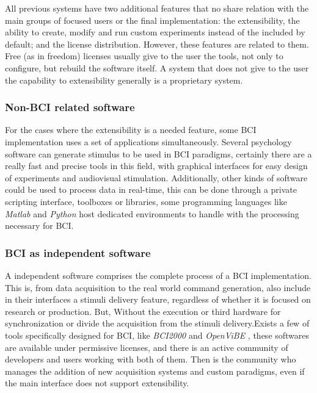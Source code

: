 All previous systems have two additional features that no share relation with the main groups of focused users or the final implementation: the extensibility, the ability to create, modify and run custom experiments instead of the included by default; and the license distribution. However, these features are related to them. Free (as in freedom) licenses usually give to the user the tools, not only to configure, but rebuild the software itself. A system that does not give to the user the capability to extensibility generally is a proprietary system.  



\subsubsection{Non-\gls*{BCI} related software}

For the cases where the extensibility is a needed feature, some \gls*{BCI} implementation uses a set of applications simultaneously. Several psychology software can generate stimulus to be used in \gls*{BCI} paradigms, certainly there are a really fast and precise tools in this field, with graphical interfaces for easy design of experiments and audiovisual stimulation. Additionally, other kinds of software could be used to process data in real-time, this can be done through a private scripting interface, toolboxes or libraries, some programming languages like \textit{Matlab} \cite{martinez2021open, choudhury2019implementation} and \textit{Python} \cite{GramfortEtAl2013a} host dedicated environments to handle with the processing necessary for \gls*{BCI}.

\subsubsection{\gls*{BCI} as independent software}

A independent software comprises the complete process of a \gls*{BCI} implementation. This is, from data acquisition to the real world command generation, also include in their interfaces a stimuli delivery feature, regardless of whether it is focused on research or production. But, Without the execution or third hardware for synchronization or divide the acquisition from the stimuli delivery.Exists a few of tools specifically designed for \gls*{BCI}, like \textit{BCI2000} \cite{schalk2004bci2000} and \textit{OpenViBE} \cite{renard2010openvibe}, these softwares are available under permissive licenses, and there is an active community of developers and users working with both of them. Then is the community who manages the addition of new acquisition systems and custom paradigms, even if the main interface does not support extensibility.

